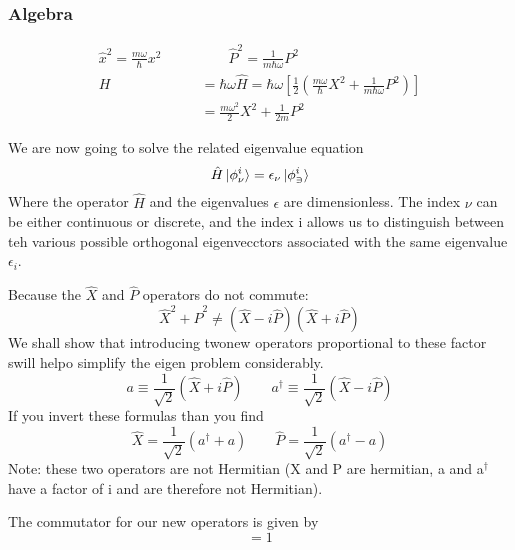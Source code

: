 \documentclass{article}
\newcommand{\be}{\begin{equation}}
\newcommand{\ee}{\end{equation}}
\newcommand{\dg}{\dagger}
\begin{document}
\subsubsection*{Algebra}
\be
\begin{split}
    \hat{x}^2= \frac{m\omega}{\hbar}x^2 \qquad & \qquad \hat{P}^2 = \frac{1}{m\hbar\omega}P^2 \\
    H &= \hbar\omega\hat{H} = \hbar\omega \left[\frac{1}{2} \left(\frac{m\omega}{\hbar} X^2 + \frac{1}{m\hbar\omega}P^2\right)\right]\\
    &= \frac{m\omega^2}{2} X^2 + \frac{1}{2m}P^2
\end{split}
\ee

We are now going to solve the related eigenvalue equation
\be
\hat{H}\ket{\phi_\nu^i} = \epsilon_\nu \ket{\phi_\ni^i}
\ee
Where the operator $\hat{H}$ and the eigenvalues $\epsilon$ are dimensionless. 
The index $\nu$ can be either continuous or discrete, and the index i allows us to distinguish between teh various possible orthogonal eigenvecctors associated with the same eigenvalue $\epsilon_i$. 

Because the $\hat{X}$ and $\hat{P}$ operators do  not commute:
\be
\hat{X}^2 + \hat{P}^2 \neq (\hat{X} - i\hat{P})(\hat{X} + i\hat{P})
\ee
We shall show that introducing twonew  operators proportional to these  factor swill helpo simplify the eigen problem considerably. 
\be
a \equiv \frac{1}{\sqrt{2}} (\hat{X} + i\hat{P}) \qquad a^\dg \equiv \frac{1}{\sqrt{2}} (\hat{X} - i\hat{P})
\ee
If  you invert these formulas than you find
\be
\hat{X} = \frac{1}{\sqrt{2}} (a^\dg + a) \qquad \hat{P} = \frac{1}{\sqrt{2}} (a^\dg - a)
\ee
Note: these two operators are not  Hermitian (X and P are hermitian, a and a$^\dg$ have a factor of i and are therefore not Hermitian). 

The commutator for our new operators is given by
\be
[a,a^\dg] = 1
\ee
\end{document}
